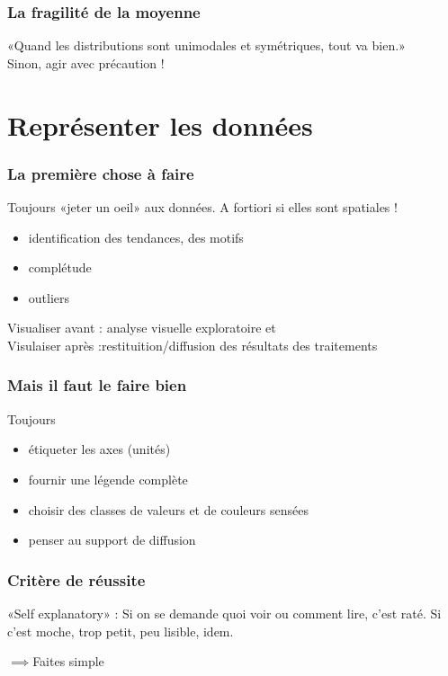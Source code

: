 \documentclass{beamer}
\begin{document}
\begin{frame}
\frametitle{La fragilité de la moyenne}

«Quand les distributions sont \alert{unimodales et symétriques}, tout va bien.» \\

Sinon, agir avec précaution !  

\end{frame}


\section{Représenter les données}


\begin{frame}
\frametitle{La première chose à faire}

Toujours «jeter un oeil» aux données.  A fortiori si elles sont spatiales ! 

\begin{itemize}
 \item identification des tendances, des motifs
 \item complétude 
 \item outliers
\end{itemize}

Visualiser \alert{avant} : analyse visuelle exploratoire  et \\ 
Visulaiser  \alert{après}  :restituition/diffusion  des résultats des traitements 

\end{frame}





\begin{frame}
\frametitle{Mais il faut le faire bien}

\alert{Toujours}

\begin{itemize}
  \item étiqueter les axes (unités)
  \item fournir une légende complète 
  \item choisir des classes de valeurs et de couleurs sensées
  \item penser au support de diffusion 
\end{itemize}

\end{frame}


\begin{frame}
\frametitle{Critère de réussite}

\alert{«Self explanatory»} : Si on se demande quoi voir ou comment lire, c'est raté. Si c'est moche, trop petit, peu lisible, idem.


\vspace{1cm}


$\implies$Faites simple 

\end{frame}
\end{document}

